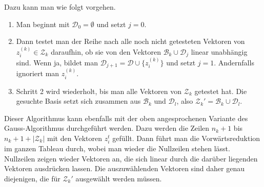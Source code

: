 Dazu kann man wie folgt vorgehen.
\begin{enumerate}
\item
Man beginnt mit $\mathcal{D}_0=\emptyset$ und setzt $j=0$.
\item
Dann testet man der Reihe nach alle noch nicht getesteten Vektoren
von $z_i^{(k)}\in\mathcal{Z}_k$ daraufhin, ob sie von den Vektoren
$\mathcal{B}_k\cup \mathcal{D}_j$ linear unabhängig sind.
Wenn ja, bildet man $\mathcal{D}_{j+1} = \mathcal{D}\cup\{z^{(k)}_i\}$ und
setzt $j=1$.
Andernfalls ignoriert man $z^{(k)}_i$.
\item
Schritt 2 wird wiederholt, bis man alle Vektoren von $\mathcal{Z}_k$
getestet hat.
Die gesuchte Basis setzt sich zusammen  aus $\mathcal{B}_k$ und
$\mathcal{D}_l$,
also
$
\mathcal{Z}_k'
=
\mathcal{B}_k
\cup
\mathcal{D}_l.
$
\end{enumerate}

Dieser Algorithmus kann ebenfalls mit der oben angesprochenen Variante
des Gauss-Algorithmus durchgeführt werden.
Dazu werden die Zeilen $n_k+1$ bis $n_k+1+|\mathcal{Z}_k|$ mit den
Vektoren $z_i^t$ gefüllt.
Dann führt man die Vorwärtsreduktion im ganzen Tableau durch, wobei
man wieder die Nullzeilen stehen lässt.
Nullzeilen zeigen wieder Vektoren an, die sich linear durch die darüber
liegenden Vektoren ausdrücken lassen.
Die auszuwählenden Vektoren sind daher genau diejenigen, die für
$\mathcal{Z}_k'$ ausgewählt werden müssen.


